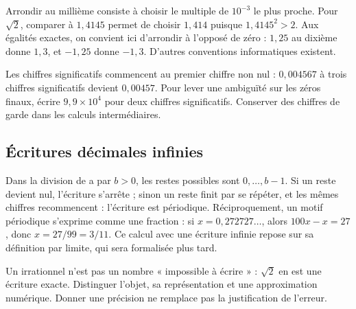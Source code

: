 \documentclass[../cours_2de.tex]{subfiles}
\begin{document}
Arrondir au millième consiste à choisir le multiple de $10^{-3}$ le plus proche. Pour $\sqrt2$, comparer à $1{,}4145$ permet de choisir $1{,}414$ puisque $1{,}4145^2>2$. Aux égalités exactes, on convient ici d'arrondir à l'opposé de zéro : $1{,}25$ au dixième donne $1{,}3$, et $-1{,}25$ donne $-1{,}3$. D'autres conventions informatiques existent.
\begin{attention}
Les chiffres significatifs commencent au premier chiffre non nul : $0{,}004567$ à trois chiffres significatifs devient $0{,}00457$. Pour lever une ambiguïté sur les zéros finaux, écrire $9{,}9\times10^4$ pour deux chiffres significatifs. Conserver des chiffres de garde dans les calculs intermédiaires.
\end{attention}
\begin{finchapitre}
\section{Écritures décimales infinies}
\approfondissement Dans la division de a par $b>0$, les restes possibles sont $0,\ldots,b-1$. Si un reste devient nul, l'écriture s'arrête ; sinon un reste finit par se répéter, et les mêmes chiffres recommencent : l'écriture est périodique. Réciproquement, un motif périodique s'exprime comme une fraction : si $x=0{,}272727\ldots$, alors $100x-x=27$, donc $x=27/99=3/11$. Ce calcul avec une écriture infinie repose sur sa définition par limite, qui sera formalisée plus tard.
\begin{retenir}
Un irrationnel n'est pas un nombre « impossible à écrire » : $\sqrt2$ en est une écriture exacte. Distinguer l'objet, sa représentation et une approximation numérique. Donner une précision ne remplace pas la justification de l'erreur.
\end{retenir}
\end{finchapitre}
\end{document}

